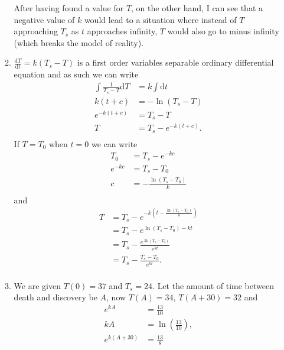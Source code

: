 \documentclass[10pt]{article}
\newcommand*{\dt}[0]{\text{d}t}
\newcommand*{\dT}[0]{\text{d}T}
\newcommand*{\df}[2]{\frac{\text{d}{#1}}{\text{d}{#2}}}%
\begin{document}
\begin{enumerate}
\begin{enumerate}
                After having found a value for $T$, on the other hand, I can
                see that a negative value of $k$ would lead to a situation
                where instead of $T$ approaching $T_s$ as $t$ approaches
                infinity, $T$ would also go to minus infinity (which breaks the
                model of reality).
            \item $\df{T}{t} = k(T_s - T)$ is a first order variables separable
                ordinary differential equation and as such we can write
                \begin{align*}
                    \int\frac{1}{T_s - T}\dT &= k\int \dt \\
                    k(t + c) &= -\ln(T_s - T) \\
                    e^{-k(t + c)} &= T_s - T \\
                    T &= T_s - e^{-k(t+c)}. \\
                \end{align*}
            If $T = T_0$ when $t = 0$ we can write
                \begin{align*}
                    T_0 &= T_s - e^{-kc} \\
                    e^{-kc} &= T_s - T_0 \\
                    c &= -\frac{\ln(T_s - T_0)}{k} \\
                \end{align*}
                and
                \begin{align*}
                    T &= T_s - e^{-k\left(t-\tfrac{\ln(T_s - T_0)}{k}\right)} \\
                      &= T_s - e^{\ln(T_s - T_0)-kt} \\
                      &= T_s - \frac{e^{\ln(T_s - T_0)}}{e^{kt}} \\
                      &= T_s - \frac{T_s - T_0}{e^{kt}}. \\
                \end{align*}
            \item We are given $T(0) = 37$ and $T_s = 24$. Let the amount of
                time between death and discovery be $A$, now $T(A) = 34$, $T(A
                + 30) = 32$ and
                \begin{align*}
                    e^{kA} &= \frac{13}{10} \\
                    kA &= \ln\left(\tfrac{13}{10}\right), \\
                      e^{k(A+30)} &= \frac{13}{8} \\

\end{align*}
\end{enumerate}
\end{enumerate}
\end{document}
